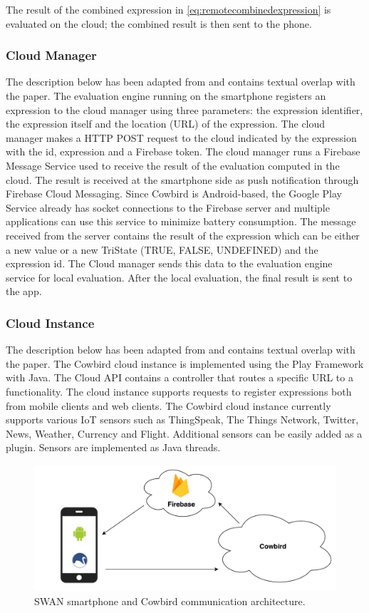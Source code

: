 The result of the combined expression in \ref{eq:remotecombinedexpression} is evaluated on the cloud; the combined result is then sent to the phone.
\subsubsection{Cloud Manager}
The description below has been adapted from \cite{cowbirdarticle} and contains textual overlap with the paper. The evaluation engine running on the smartphone registers an expression to the cloud manager using three parameters: the expression identifier, the expression itself and the location (URL) of the expression. The cloud manager makes a HTTP POST request to the cloud indicated by the expression with the id, expression and a Firebase token. The cloud manager runs a Firebase Message Service used to receive the result of the evaluation computed in the cloud. The result is received at the smartphone side as push notification through Firebase Cloud Messaging. 
Since Cowbird is Android-based, the Google Play Service already has socket connections to the Firebase server and multiple applications can use this service to minimize battery consumption. The message received from the server contains the result of the expression which can be either a new value or a new TriState (TRUE, FALSE, UNDEFINED) and the expression id. The Cloud manager sends this data to the evaluation engine service for local evaluation. After the local evaluation, the final result is sent to the app.
\subsubsection{Cloud Instance}
The description below has been adapted from \cite{cowbirdarticle} and contains textual overlap with the paper. The Cowbird cloud instance is implemented using the Play Framework \cite{playframeworkonline} with Java. The Cloud API contains a controller that routes a specific URL to a functionality. The cloud instance supports requests to register expressions both from mobile clients and web clients. The Cowbird cloud instance currently supports various IoT sensors such as ThingSpeak, The Things Network, Twitter, News, Weather, Currency and Flight. Additional sensors can be easily added as a plugin. Sensors are implemented as Java threads.

 \begin{figure}[ht!]
\includegraphics[width=1\textwidth]{images/cowbird_communication.pdf}
 \caption{SWAN smartphone and Cowbird communication architecture.}
\label{fig:cowbird_communication_architecture}
\end{figure}

